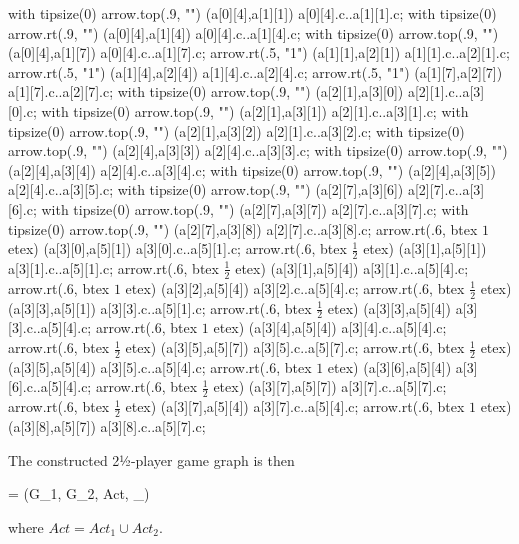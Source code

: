     with tipsize(0) arrow.top(.9, "") (a[0][4],a[1][1]) a[0][4].c..a[1][1].c;
    with tipsize(0) arrow.rt(.9, "") (a[0][4],a[1][4]) a[0][4].c..a[1][4].c;
    with tipsize(0) arrow.top(.9, "") (a[0][4],a[1][7]) a[0][4].c..a[1][7].c;
    arrow.rt(.5, "1") (a[1][1],a[2][1]) a[1][1].c..a[2][1].c;
    arrow.rt(.5, "1") (a[1][4],a[2][4]) a[1][4].c..a[2][4].c;
    arrow.rt(.5, "1") (a[1][7],a[2][7]) a[1][7].c..a[2][7].c;
    with tipsize(0) arrow.top(.9, "") (a[2][1],a[3][0]) a[2][1].c..a[3][0].c;
    with tipsize(0) arrow.top(.9, "") (a[2][1],a[3][1]) a[2][1].c..a[3][1].c;
    with tipsize(0) arrow.top(.9, "") (a[2][1],a[3][2]) a[2][1].c..a[3][2].c;
    with tipsize(0) arrow.top(.9, "") (a[2][4],a[3][3]) a[2][4].c..a[3][3].c;
    with tipsize(0) arrow.top(.9, "") (a[2][4],a[3][4]) a[2][4].c..a[3][4].c;
    with tipsize(0) arrow.top(.9, "") (a[2][4],a[3][5]) a[2][4].c..a[3][5].c;
    with tipsize(0) arrow.top(.9, "") (a[2][7],a[3][6]) a[2][7].c..a[3][6].c;
    with tipsize(0) arrow.top(.9, "") (a[2][7],a[3][7]) a[2][7].c..a[3][7].c;
    with tipsize(0) arrow.top(.9, "") (a[2][7],a[3][8]) a[2][7].c..a[3][8].c;
    arrow.rt(.6, btex $1$ etex) (a[3][0],a[5][1]) a[3][0].c..a[5][1].c;
    arrow.rt(.6, btex $\frac{1}{2}$ etex) (a[3][1],a[5][1]) a[3][1].c..a[5][1].c;
    arrow.rt(.6, btex $\frac{1}{2}$ etex) (a[3][1],a[5][4]) a[3][1].c..a[5][4].c;
    arrow.rt(.6, btex $1$ etex) (a[3][2],a[5][4]) a[3][2].c..a[5][4].c;
    arrow.rt(.6, btex $\frac{1}{2}$ etex) (a[3][3],a[5][1]) a[3][3].c..a[5][1].c;
    arrow.rt(.6, btex $\frac{1}{2}$ etex) (a[3][3],a[5][4]) a[3][3].c..a[5][4].c;
    arrow.rt(.6, btex $1$ etex) (a[3][4],a[5][4]) a[3][4].c..a[5][4].c;
    arrow.rt(.6, btex $\frac{1}{2}$ etex) (a[3][5],a[5][7]) a[3][5].c..a[5][7].c;
    arrow.rt(.6, btex $\frac{1}{2}$ etex) (a[3][5],a[5][4]) a[3][5].c..a[5][4].c;
    arrow.rt(.6, btex $1$ etex) (a[3][6],a[5][4]) a[3][6].c..a[5][4].c;
    arrow.rt(.6, btex $\frac{1}{2}$ etex) (a[3][7],a[5][7]) a[3][7].c..a[5][7].c;
    arrow.rt(.6, btex $\frac{1}{2}$ etex) (a[3][7],a[5][4]) a[3][7].c..a[5][4].c;
    arrow.rt(.6, btex $1$ etex) (a[3][8],a[5][7]) a[3][8].c..a[5][7].c;
\stopreusableMPgraphic

\startsubsection[title={Synopsis},reference=sec:abstraction-graph-synopsis]

    The constructed 2½-player game graph is then

    \startformula
        \GameGraph = (G_1, G_2, Act, \Transition_\GameGraph) \EndComma
    \stopformula

    where $Act = Act_1 \cup Act_2$.

